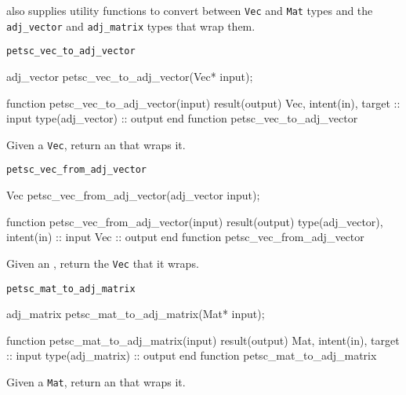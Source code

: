 \libadjoint also supplies utility functions to convert between \texttt{Vec} and \texttt{Mat}
types and the \texttt{adj_vector} and \texttt{adj_matrix} types that wrap them.
\begin{boxwithtitle}{\texttt{petsc_vec_to_adj_vector}}
\begin{minipage}{\columnwidth}
\begin{ccode}
  adj_vector petsc_vec_to_adj_vector(Vec* input);
\end{ccode}
\begin{fortrancode}
  function petsc_vec_to_adj_vector(input) result(output)
    Vec, intent(in), target :: input
    type(adj_vector) :: output
  end function petsc_vec_to_adj_vector
\end{fortrancode}
\end{minipage}
\end{boxwithtitle}
Given a \texttt{Vec}, return an  that wraps it.
\begin{boxwithtitle}{\texttt{petsc_vec_from_adj_vector}}
\begin{minipage}{\columnwidth}
\begin{ccode}
  Vec petsc_vec_from_adj_vector(adj_vector input);
\end{ccode}
\begin{fortrancode}
  function petsc_vec_from_adj_vector(input) result(output)
    type(adj_vector), intent(in) :: input
    Vec :: output
  end function petsc_vec_from_adj_vector
\end{fortrancode}
\end{minipage}
\end{boxwithtitle}
Given an , return the \texttt{Vec} that it wraps.
\begin{boxwithtitle}{\texttt{petsc_mat_to_adj_matrix}}
\begin{minipage}{\columnwidth}
\begin{ccode}
  adj_matrix petsc_mat_to_adj_matrix(Mat* input);
\end{ccode}
\begin{fortrancode}
  function petsc_mat_to_adj_matrix(input) result(output)
    Mat, intent(in), target :: input
    type(adj_matrix) :: output
  end function petsc_mat_to_adj_matrix
\end{fortrancode}
\end{minipage}
\end{boxwithtitle}
Given a \texttt{Mat}, return an  that wraps it.
